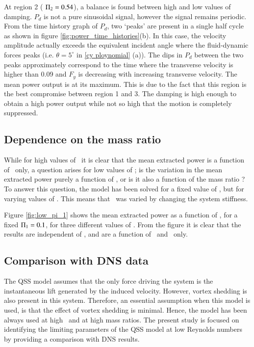 At region 2 ( $\Pi_2=0.54$), a balance is found between high and low values of damping. $P_d$ is not a pure sinusoidal signal, however the signal remains periodic. From the time history graph of $P_d$, two `peaks' are present in a single half cycle as shown in figure \ref{fig:power_time_histories}(b). In this case, the velocity amplitude actually exceeds the equivalent incident angle where the fluid-dynamic forces peaks (i.e. $\theta=5^\circ$ in \ref{cy ploynomial} (a)). The dips in $P_d$ between the two peaks approximately correspond to the time where the transverse velocity is higher than 0.09 and $F_y$ is decreasing with increasing transverse velocity. The mean power output is at its maximum. This is due to the fact that this region is the best compromise between region 1 and 3. The damping is high enough to obtain a high power output while not so high that the motion is completely suppressed.

\subsection{Dependence on the mass ratio \mstar}
\label{sec:mstar}
While for high values of \massstiff\ it is clear that the mean extracted power is a function of \massdamp\ only, a question arises for low values of \massstiff; is the variation in the mean extracted power purely a function of \massstiff, or is it also a function of the mass ratio \mstar? To answer this question, the model has been solved for a fixed value of \massstiff, but for varying values of \mstar. This means that \massstiff\ was varied by changing the system stiffness.

Figure \ref{fig:low_pi_1} shows the mean extracted power as a function of \massdamp, for a fixed $\Pi_1 = 0.1$, for three different values of \mstar. From the figure it is clear that the results are independent of \mstar, and are a function of \massstiff\ and \massdamp\ only.


 
\subsection{Comparison with DNS data}
\label{sec:dns}

The QSS model assumes that the only force driving the system is the instantaneous lift generated by the induced velocity. However, vortex shedding is also present in this system. Therefore, an essential assumption when this model is used, is that the effect of vortex shedding is minimal. Hence, the model has been always used at high \reynoldsnumber \ and  at high mass ratios. The present study is focused on identifying the limiting parameters of the QSS model at low Reynolds numbers by providing a comparison with DNS results. 

